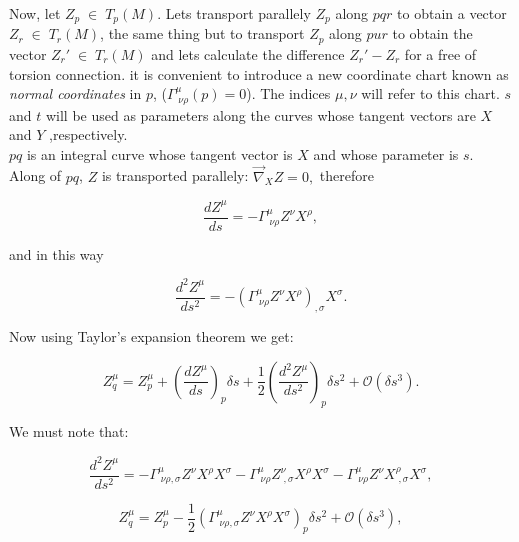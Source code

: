             Now, let $Z_p \;\in\;T_p(M)$.  Lets transport parallely $Z_p$ along $pqr$ to obtain a vector $Z_r \;\in\; T_r(M)$, the same thing but to transport $Z_p$ along $pur$ to obtain the vector $Z_r'\;\in\;T_r(M)$ and lets calculate the difference $Z_r'-Z_r$ for a free of torsion connection. it is convenient to introduce a new coordinate chart known as \textit{normal coordinates} in $p$, ($\Gamma^{\mu}_{\;\nu\rho}(p)=0$). The indices $\mu,\nu$ will refer to this chart. $s$ and $t$ will be used as parameters along the curves whose tangent vectors are $X$ and $Y$ ,respectively. \\

            $pq$ is an integral curve whose tangent vector is $X$ and whose parameter is $s$. Along of $pq$, $Z$ is transported parallely: $\Vec{\nabla}_XZ=0,$ therefore

            \begin{equation}
                \frac{d Z^{\mu}}{ds} = - \Gamma^{\mu}_{\;\nu\rho}Z^{\nu}X^{\rho},
            \end{equation}

            and in this way

            \begin{equation}
                \frac{d^2Z^{\mu}}{ds^2} = - \left(\Gamma^{\mu}_{\;\nu\rho}Z^{\nu}X^{\rho} \right)_{,\sigma}X^{\sigma}.
            \end{equation}

            Now using Taylor's expansion theorem we get:

            \begin{equation}
                Z^{\mu}_q = Z^{\mu}_p + \left(\frac{dZ^{\mu}}{ds} \right)_p\delta s + \frac{1}{2}\left(\frac{d^2Z^{\mu}}{ds^2} \right)_p\delta s^2 + \mathcal{O}(\delta s^3).
            \end{equation}

            We must note that:

            \begin{equation}
                \frac{d^2Z^{\mu}}{ds^2}=-\Gamma^{\mu}_{\;\nu\rho,\sigma}Z^{\nu}X^{\rho}X^{\sigma} - \Gamma^{\mu}_{\;\nu\rho}Z^{\nu}_{\;,\sigma}X^{\rho}X^{\sigma} - \Gamma^{\mu}_{\;\nu\rho}Z^{\nu}X^{\rho}_{\;,\sigma}X^{\sigma},
            \end{equation}

            \begin{equation}
                Z^{\mu}_q = Z^{\mu}_p - \frac{1}{2}\left(\Gamma^{\mu}_{\;\nu\rho,\sigma}Z^{\nu}X^{\rho}X^{\sigma} \right)_p\delta s^2 + \mathcal{O}(\delta s^3),
            \end{equation}

